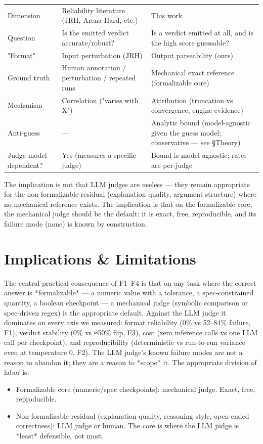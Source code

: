 \documentclass[10pt,twocolumn]{article}
\begin{document}
\begin{table}[h]
\centering
\begin{tabular}{lll}
Dimension & Reliability literature (JRH, Arena-Hard, etc.) & This work \\
Question & Is the emitted verdict accurate/robust? & Is a verdict emitted at all, and is the high score guessable? \\
"Format" & Input perturbation (JRH) & Output parseability (ours) \\
Ground truth & Human annotation / perturbation / repeated runs & Mechanical exact reference (formalizable core) \\
Mechanism & Correlation ("varies with X") & Attribution (truncation vs convergence, engine evidence) \\
Anti-guess & — & Analytic bound (model-agnostic given the guess model; conservative — see §Theory) \\
Judge-model dependent? & Yes (measures a specific judge) & Bound is model-agnostic; rates are per-judge
\end{tabular}
\end{table}


The implication is not that LLM judges are useless — they remain appropriate for the non-formalizable residual (explanation quality, argument structure) where no mechanical reference exists. The implication is that on the formalizable core, the mechanical judge should be the default: it is exact, free, reproducible, and its failure mode (none) is known by construction.

\section{Implications \& Limitations}
The central practical consequence of F1–F4 is that on any task where the correct answer is *formalizable* — a numeric value with a tolerance, a spec-constrained quantity, a boolean checkpoint — a mechanical judge (symbolic comparison or spec-driven regex) is the appropriate default. Against the LLM judge it dominates on every axis we measured: format reliability (0\% vs 52–84\% failure, F1), verdict stability (0\% vs ≈50\% flip, F3), cost (zero inference calls vs one LLM call per checkpoint), and reproducibility (deterministic vs run-to-run variance even at temperature 0, F2). The LLM judge's known failure modes are not a reason to abandon it; they are a reason to *scope* it. The appropriate division of labor is:


\begin{itemize}
  \item Formalizable core (numeric/spec checkpoints): mechanical judge. Exact, free, reproducible.
  \item Non-formalizable residual (explanation quality, reasoning style, open-ended correctness): LLM judge or human. The core is where the LLM judge is *least* defensible, not most.
\end{itemize}
\end{document}
